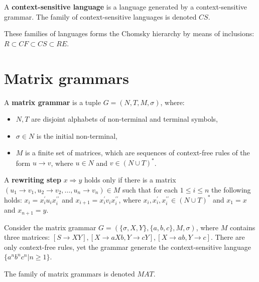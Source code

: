 \begin{definition}
A {\bf context-sensitive language} is a language generated by a context-sensitive grammar. The family of context-sensitive languages is denoted $CS$.
\end{definition}

These families of languages forms the Chomsky hierarchy by means of inclusions: $R \subset CF \subset CS \subset RE$.


\section{Matrix grammars} %
\label{sec:matrix_grammars}

\begin{definition}
A {\bf matrix grammar} is a tuple $G = (N,T,M,\sigma)$, where:
\begin{itemize}
  \item $N, T$ are disjoint alphabets of non-terminal and terminal symbols,
  \item $\sigma\in N$ is the initial non-terminal,
  \item $M$ is a finite set of matrices, which are sequences of context-free rules of the form $u\rightarrow v$, where $u\in N$ and $v\in (N\cup T)^*$.
\end{itemize}
\end{definition}

\begin{definition}
A {\bf rewriting step} $x\Rightarrow y$ holds only if there is a matrix $(u_1\rightarrow v_1, u_2\rightarrow v_2, \ldots, u_n\rightarrow v_n) \in M$ such that for each $1\leq i\leq n$ the following holds: $x_i = x_i^{\prime}u_ix_i^{\prime\prime}$ and $x_{i+1} = x_i^{\prime}v_ix_i^{\prime\prime}$, where $x_i, x_i^{\prime}, x_i^{\prime\prime} \in (N\cup T)^*$ and $x_1 = x$ and $x_{n+1} = y$.
\end{definition}

\begin{example}
Consider the matrix grammar $G=(\{\sigma, X,Y\}, \{ a,b,c\}, M, \sigma)$, where $M$ contains three matrices: $[S\rightarrow XY], [X\rightarrow aXb, Y\rightarrow cY], [X\rightarrow ab, Y\rightarrow c]$. There are only context-free rules, yet the grammar generate the context-sensitive language $\{a^nb^nc^n|n\geq 1\}$.
\end{example}

The family of matrix grammars is denoted $MAT$.

